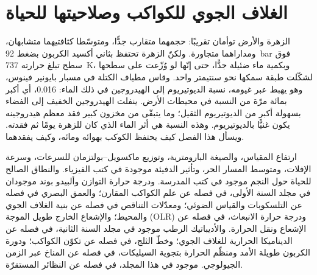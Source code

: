 \chapter{الغلاف الجوي للكواكب وصلاحيتها للحياة}\label{ch:b3:planetary-atmospheres}

الزهرة والأرض توأمان تقريبًا: حجمهما متقارب جدًّا، ومتوسّطا كثافتيهما متشابهان،
ومداراهما متجاورة. ولكنّ الزهرة تحتفظ بثاني أكسيد الكربون بضغط \qty{92}{bar}
فوق سطح تبلغ حرارته \qty{737}{K}، وبكمية ماء ضئيلة جدًّا، حتى إنّها لو وُزّعت
على سطحها لشكّلت طبقة سمكها نحو سنتيمتر واحد.
وقاس مطياف الكتلة في مسبار بايونير فينوس، وهو يهبط عبر غيومه، نسبة الديوتيريوم إلى الهيدروجين في ذلك الماء:
\num{0.016}، أي أكبر بمائة مرّة من النسبة في محيطات الأرض.
ينفلت الهيدروجين الخفيف إلى الفضاء بسهولة أكبر من الديوتيريوم الثقيل؛ وما يتبقّى
من مخزون كبير فقد معظم هيدروجينه
يكون غنيًّا بالديوتيريوم. وهذه النسبة هي أثر الماء الذي كان للزهرة يومًا ثم
فقدته. ويسأل هذا الفصل كيف يحتفظ الكوكب
بهوائه ومائه، وكيف يفقدهما.

\begin{recall}
ارتفاع المقياس، والصيغة البارومترية، وتوزيع ماكسويل--بولتزمان
للسرعات، وسرعة الإفلات، ومتوسط المسار الحر، وتأثير الدفيئة
موجودة في كتب الفيزياء. والنطاق الصالح للحياة حول النجم موجود في كتب
المدرسة. ودرجة حرارة التوازن وألبيدو بوند موجودان في
مجلد السنة الأولى، في فصله عن علم الكواكب المقارن؛ والعمق البصري
في فصله عن التلسكوبات والقياس الضوئي؛ ومعدّلات التناقص في
فصله عن بنية الغلاف الجوي والمحيط؛ والإشعاع الخارج
طويل الموجة (OLR) ودرجة حرارة الانبعاث، في فصله عن
الإشعاع ونقل الحرارة. والأديباتيك الرطب موجود في مجلد السنة الثانية،
في فصله عن الديناميكا الحرارية للغلاف الجوي؛ وخطّ الثلج، في
فصله عن تكوّن الكواكب؛ ودورة الكربون طويلة الأمد
ومنظّم الحرارة بتجوية السيليكات، في فصله عن المناخ عبر الزمن
الجيولوجي.  موجود في هذا المجلد، في فصله عن
النظائر المستقرّة.
\end{recall}


